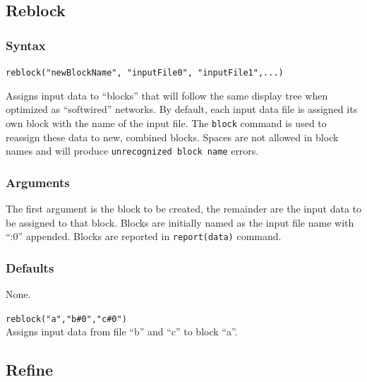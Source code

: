 \subsection{Reblock}
\label{subsec:reblock}
	\subsubsection{Syntax}
		\texttt{reblock("newBlockName", "inputFile0", "inputFile1",...)}
	
	\begin{phygdescription}
	{Assigns input data to ``blocks'' that will follow the same display tree when optimized
	as ``softwired'' networks. By default, each input data file is assigned its own block with 
	the name of the input file. The \texttt{block} command is used to reassign these data to 
	new, combined blocks. Spaces are not allowed in block names and will produce 
	\texttt{unrecognized block name} errors.} 
	\end{phygdescription}
	
	\subsubsection{Arguments}
		The first argument is the block to be created, the remainder are the input data to 
		be assigned to that block. Blocks are initially named as the input file name with 
		``:0'' appended. Blocks are reported in \texttt{report(data)} command.
	
	\subsubsection{Defaults}
		None.
	
	\begin{example}

		\item{\texttt{reblock("a","b\#0","c\#0")}\\ Assigns input data from file ``b'' and ``c'' 
		to block ``a''. }
	
	\end{example}

\subsection{Refine}
\label{subsec:refine}
